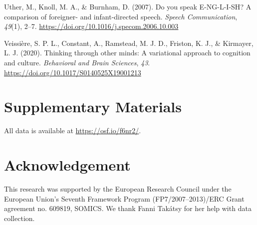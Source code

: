 \documentclass[
  man,floatsintext]{apa6}
\newlength{\cslhangindent}
\newlength{\cslentryspacingunit} %
\newenvironment{CSLReferences}[2] %
 {%
  \setlength{\parindent}{0pt}
  \ifodd #1
  \let\oldpar\par
  \def\par{\hangindent=\cslhangindent\oldpar}
  \fi
  \setlength{\parskip}{#2\cslentryspacingunit}
 }%
 {}
\begin{document}
\begin{CSLReferences}{1}{0}
\leavevmode{}%
Uther, M., Knoll, M. A., \& Burnham, D. (2007). Do you speak {E-NG-L-I-SH}? {A} comparison of foreigner- and infant-directed speech. \emph{Speech Communication}, \emph{49}(1), 2--7. \url{https://doi.org/10.1016/j.specom.2006.10.003}

\leavevmode{}%
Veissière, S. P. L., Constant, A., Ramstead, M. J. D., Friston, K. J., \& Kirmayer, L. J. (2020). Thinking through other minds: {A} variational approach to cognition and culture. \emph{Behavioral and Brain Sciences}, \emph{43}. \url{https://doi.org/10.1017/S0140525X19001213}

\end{CSLReferences}

\endgroup

\newpage

\hypertarget{supplementary-materials}{%
\section{Supplementary Materials}\label{supplementary-materials}}

All data is available at \url{https://osf.io/f6nr2/}.

\hypertarget{acknowledgement}{%
\section{Acknowledgement}\label{acknowledgement}}

This research was supported by the European Research Council under the European Union's Seventh Framework Program (FP7/2007--2013)/ERC Grant agreement no. 609819, SOMICS. We thank Fanni Takátsy for her help with data collection.


\clearpage
\renewcommand{\listfigurename}{Figure captions}
\end{document}
